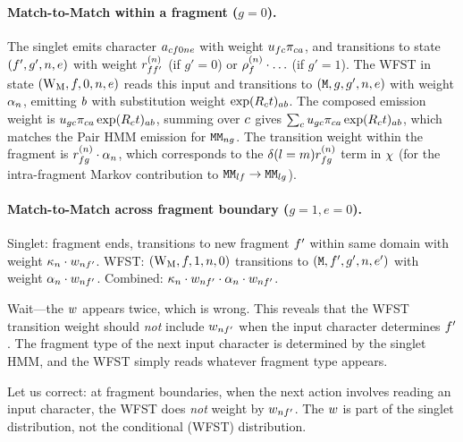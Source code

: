 \paragraph{Match-to-Match within a fragment ($g=0$).}
The singlet emits character $a_{cf 0n e}$ with weight
$u_{fc} \pi_{ca}$,
and transitions to state $(f', g', n, e)$ with weight $r^{(n)}_{ff'}$ (if $g'=0$)
or $\rho^{(n)}_f \cdot \ldots$ (if $g'=1$).
The WFST in state $(\mathrm{W_M}, f, 0, n, e)$ reads this input and
transitions to $({\tt M}, g, g', n, e)$ with weight $\alpha_n$,
emitting $b$ with substitution weight $\exp(R_c t)_{ab}$.
The composed emission weight is
$u_{gc} \pi_{ca} \exp(R_c t)_{ab}$,
summing over $c$ gives
$\sum_c u_{gc} \pi_{ca} \exp(R_c t)_{ab}$,
which matches the Pair HMM emission for ${\tt M}{\tt M}_{ng}$.
The transition weight within the fragment is $r^{(n)}_{fg}
\cdot \alpha_n$, which corresponds to the $\delta(l=m) r^{(n)}_{fg}$
term in $\chi$ (for the intra-fragment Markov contribution to
${\tt M}{\tt M}_{lf} \to {\tt M}{\tt M}_{lg}$).

\paragraph{Match-to-Match across fragment boundary ($g=1, e=0$).}
Singlet: fragment ends, transitions to new fragment $f'$ within same domain
with weight $\kappa_n \cdot w_{nf'}$.
WFST: $(\mathrm{W_M}, f, 1, n, 0)$ transitions to $({\tt M}, f', g', n, e')$
with weight $\alpha_n \cdot w_{nf'}$.
Combined: $\kappa_n \cdot w_{nf'} \cdot \alpha_n \cdot w_{nf'}$.

Wait---the $w$ appears twice, which is wrong.
This reveals that the WFST transition weight should \emph{not} include $w_{nf'}$
when the input character determines $f'$.
The fragment type of the next input character is determined by the singlet HMM,
and the WFST simply reads whatever fragment type appears.

Let us correct: at fragment boundaries, when the next action involves reading an input
character, the WFST does \emph{not} weight by $w_{nf'}$.
The $w$ is part of the singlet distribution, not the conditional (WFST) distribution.


